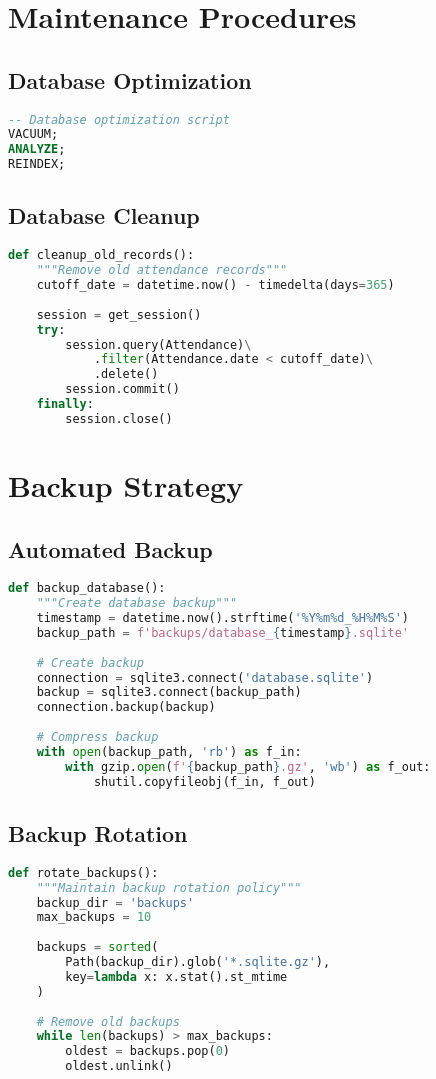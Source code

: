 \section{Maintenance Procedures}

\subsection{Database Optimization}
\begin{lstlisting}[language=SQL]
-- Database optimization script
VACUUM;
ANALYZE;
REINDEX;
\end{lstlisting}

\subsection{Database Cleanup}
\begin{lstlisting}[language=Python]
def cleanup_old_records():
    """Remove old attendance records"""
    cutoff_date = datetime.now() - timedelta(days=365)
    
    session = get_session()
    try:
        session.query(Attendance)\
            .filter(Attendance.date < cutoff_date)\
            .delete()
        session.commit()
    finally:
        session.close()
\end{lstlisting}

\section{Backup Strategy}

\subsection{Automated Backup}
\begin{lstlisting}[language=Python]
def backup_database():
    """Create database backup"""
    timestamp = datetime.now().strftime('%Y%m%d_%H%M%S')
    backup_path = f'backups/database_{timestamp}.sqlite'
    
    # Create backup
    connection = sqlite3.connect('database.sqlite')
    backup = sqlite3.connect(backup_path)
    connection.backup(backup)
    
    # Compress backup
    with open(backup_path, 'rb') as f_in:
        with gzip.open(f'{backup_path}.gz', 'wb') as f_out:
            shutil.copyfileobj(f_in, f_out)
\end{lstlisting}

\subsection{Backup Rotation}
\begin{lstlisting}[language=Python]
def rotate_backups():
    """Maintain backup rotation policy"""
    backup_dir = 'backups'
    max_backups = 10
    
    backups = sorted(
        Path(backup_dir).glob('*.sqlite.gz'),
        key=lambda x: x.stat().st_mtime
    )
    
    # Remove old backups
    while len(backups) > max_backups:
        oldest = backups.pop(0)
        oldest.unlink()
\end{lstlisting}

